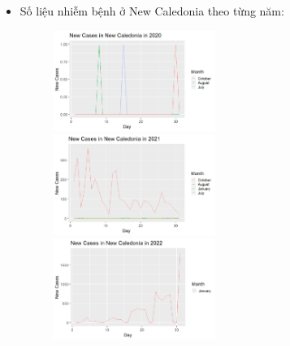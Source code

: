 \documentclass[a4paper]{article}
\theoremstyle{definition}
\begin{document}
\begin{enumerate}[i)]
\begin{enumerate}[1]
    \begin{itemize}
   \item{Số liệu nhiễm bệnh ở New Caledonia theo từng năm:}
     \begin{figure}[hpt!]
    \includegraphics[width=0.5\textwidth]{Images/1.4v.png}
    \includegraphics[width=0.5\textwidth]{Images/1.5v.png}
    \includegraphics[width=0.5\textwidth]{Images/1.6v.png}
  \end{figure}
    \end{itemize}
    

\end{enumerate}
\end{enumerate}
\end{document}

